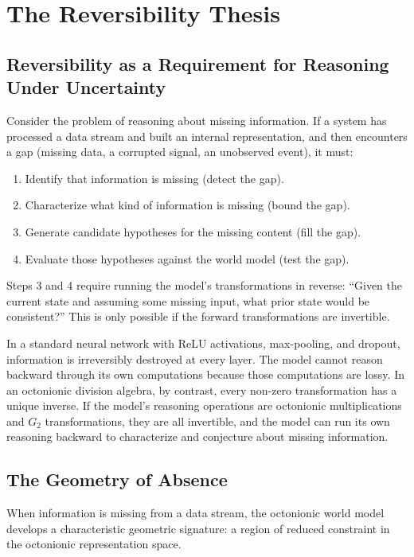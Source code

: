 \documentclass[11pt,a4paper]{article}
\begin{document}
\section{The Reversibility Thesis}
\label{sec:reversibility}

\subsection{Reversibility as a Requirement for Reasoning Under Uncertainty}

Consider the problem of reasoning about missing information. If a system has processed a data stream and built an internal representation, and then encounters a gap (missing data, a corrupted signal, an unobserved event), it must:
\begin{enumerate}[nosep]
  \item Identify that information is missing (detect the gap).
  \item Characterize what kind of information is missing (bound the gap).
  \item Generate candidate hypotheses for the missing content (fill the gap).
  \item Evaluate those hypotheses against the world model (test the gap).
\end{enumerate}

Steps 3 and 4 require running the model's transformations in reverse: ``Given the current state and assuming some missing input, what prior state would be consistent?'' This is only possible if the forward transformations are invertible.

In a standard neural network with ReLU activations, max-pooling, and dropout, information is irreversibly destroyed at every layer. The model cannot reason backward through its own computations because those computations are lossy. In an octonionic division algebra, by contrast, every non-zero transformation has a unique inverse. If the model's reasoning operations are octonionic multiplications and $G_2$ transformations, they are all invertible, and the model can run its own reasoning backward to characterize and conjecture about missing information.

\subsection{The Geometry of Absence}
\label{sec:absence}

When information is missing from a data stream, the octonionic world model develops a characteristic geometric signature: a region of reduced constraint in the octonionic representation space.
\end{document}
